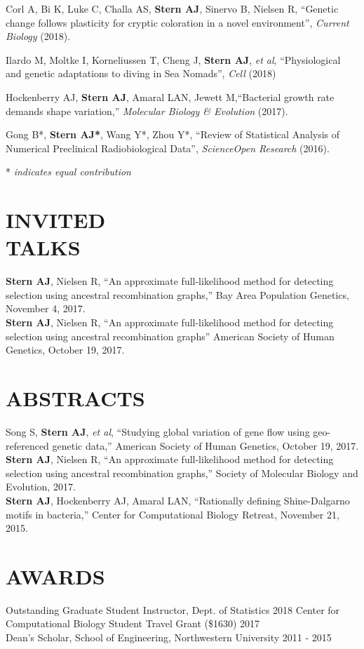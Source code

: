 \documentclass[margin, 10pt]{res} %
\begin{document}
\begin{resume}
Corl A, Bi K, Luke C, Challa AS, {\bf Stern AJ}, Sinervo B, Nielsen R, ``Genetic change follows plasticity for cryptic coloration in a novel environment'', {\it Current Biology} (2018).

Ilardo M, Moltke I, Korneliussen T, Cheng J, {\bf Stern AJ}, {\it et al}, ``Physiological and genetic adaptations to diving in Sea Nomads'', {\it Cell} (2018)

Hockenberry AJ, {\bf Stern AJ}, Amaral LAN, Jewett M,``Bacterial growth rate demands shape variation,'' {\it Molecular Biology \& Evolution} (2017).

Gong B*, {\bf Stern AJ*}, Wang Y*, Zhou Y*, ``Review of Statistical Analysis of Numerical Preclinical Radiobiological Data'', {\it ScienceOpen Research} (2016). 


* {\it indicates equal contribution}


\section{INVITED\\TALKS}
{\bf Stern AJ}, Nielsen R, ``An approximate full-likelihood method for detecting selection using ancestral recombination graphs,'' Bay Area Population Genetics, November 4, 2017.\\
{\bf Stern AJ}, Nielsen R, ``An approximate full-likelihood method for detecting selection using ancestral recombination graphs'' American Society of Human Genetics, October 19, 2017.

\section{ABSTRACTS}
Song S, {\bf Stern AJ}, {\it et al}, ``Studying global variation of gene flow using geo-referenced genetic data,'' American Society of Human Genetics, October 19, 2017.\\
{\bf Stern AJ}, Nielsen R, ``An approximate full-likelihood method for detecting selection using ancestral recombination graphs,'' Society of Molecular Biology and Evolution, 2017.\\
{\bf Stern AJ}, Hockenberry AJ,  Amaral LAN, “Rationally defining Shine-Dalgarno motifs in bacteria,” Center for Computational Biology Retreat, November 21, 2015.

\section{AWARDS} 

Outstanding Graduate Student Instructor, Dept. of Statistics \hfill 2018
Center for Computational Biology Student Travel Grant (\$1630) \hfill 2017\\
Dean’s Scholar, School of Engineering, Northwestern University \hfill 2011 - 2015\\


\end{resume}
\end{document}
